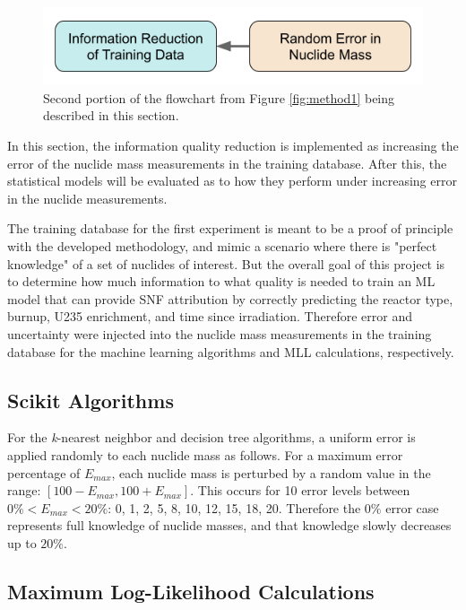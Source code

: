 \begin{figure}[H]
  \centering
  \includegraphics[width=0.7\linewidth]{./chapters/exp1/methodology1_2.png}
  \caption[Second portion of the flowchart from Figure \ref{fig:method1}]
          {Second portion of the flowchart from Figure \ref{fig:method1} being 
           described in this section.}
\end{figure}

In this section, the information quality reduction is implemented as increasing
the error of the nuclide mass measurements in the training database. After
this, the statistical models will be evaluated as to how they perform under
increasing error in the nuclide measurements. 

The training database for the first experiment is meant to be a proof of
principle with the developed methodology, and mimic a scenario where there is
"perfect knowledge" of a set of nuclides of interest.  But the overall goal of
this project is to determine how much information to what quality is needed to
train an \gls{ML} model that can provide \gls{SNF} attribution by correctly
predicting the reactor type, burnup, \gls{U235} enrichment, and time since
irradiation.  Therefore error and uncertainty were injected into the nuclide
mass measurements in the training database for the machine learning algorithms
and \gls{MLL} calculations, respectively. 

\subsection{Scikit Algorithms}

For the \textit{k}-nearest neighbor and decision tree algorithms, a uniform
error is applied randomly to each nuclide mass as follows.  For a maximum error
percentage of $E_{max}$, each nuclide mass is perturbed by a random value in the
range: $[100-E_{max},100+E_{max}]$.  This occurs for 10 error levels between
$0\% < E_{max} < 20\%$: 0, 1, 2, 5, 8, 10, 12, 15, 18, 20. Therefore the $0\%$
error case represents full knowledge of nuclide masses, and that knowledge
slowly decreases up to $20\%$. 

\subsection{Maximum Log-Likelihood Calculations}

